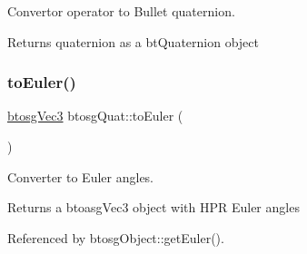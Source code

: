 Convertor operator to Bullet quaternion. 

Returns quaternion as a bt\+Quaternion object \mbox{\label{classbtosgQuat_aeda394d825b449ab87a77820aad1737d}} 
\subsubsection{\texorpdfstring{to\+Euler()}{toEuler()}}
{\footnotesize\ttfamily \hyperlink{classbtosgVec3}{btosg\+Vec3} btosg\+Quat\+::to\+Euler (\begin{DoxyParamCaption}{ }\end{DoxyParamCaption})}



Converter to Euler angles. 

Returns a btoasg\+Vec3 object with H\+PR Euler angles 

Referenced by btosg\+Object\+::get\+Euler().




